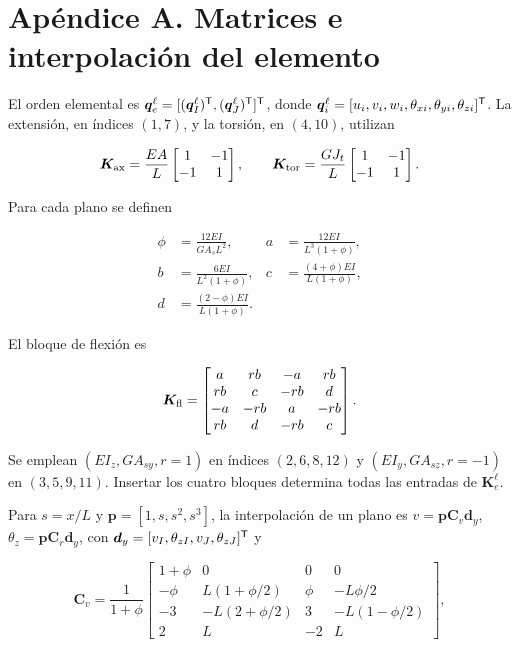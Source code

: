\section{Apéndice A. Matrices e interpolación del elemento}
El orden elemental es $\bm q_e^\ell=[(\bm q_I^\ell)^\mathsf T,(\bm q_J^\ell)^\mathsf T]^\mathsf T$, donde $\bm q_i^\ell=[u_i,v_i,w_i,\theta_{xi},\theta_{yi},\theta_{zi}]^\mathsf T$. La extensión, en índices $(1,7)$, y la torsión, en $(4,10)$, utilizan

\begin{equation}
\bm K_{\rm ax}=\frac{EA}{L}\begin{bmatrix}1&-1\\-1&1\end{bmatrix},\qquad
\bm K_{\rm tor}=\frac{GJ_t}{L}\begin{bmatrix}1&-1\\-1&1\end{bmatrix}.
\end{equation}

Para cada plano se definen

\begin{align}
\phi&=\frac{12EI}{GA_sL^2},&a&=\frac{12EI}{L^3(1+\phi)},\nonumber\\
b&=\frac{6EI}{L^2(1+\phi)},&c&=\frac{(4+\phi)EI}{L(1+\phi)},\nonumber\\
d&=\frac{(2-\phi)EI}{L(1+\phi)}.
\end{align}

El bloque de flexión es

\begin{equation}
\bm K_{\rm fl}=\begin{bmatrix}
a&rb&-a&rb\\rb&c&-rb&d\\-a&-rb&a&-rb\\rb&d&-rb&c
\end{bmatrix}.
\end{equation}

Se emplean $(EI_z,GA_{sy},r=1)$ en índices $(2,6,8,12)$ y $(EI_y,GA_{sz},r=-1)$ en $(3,5,9,11)$. Insertar los cuatro bloques determina todas las entradas de $\bm K_e^\ell$.

Para $s=x/L$ y $\bm p=[1,s,s^2,s^3]$, la interpolación de un plano es $v=\bm p\bm C_v\bm d_y$, $\theta_z=\bm p\bm C_r\bm d_y$, con $\bm d_y=[v_I,\theta_{zI},v_J,\theta_{zJ}]^\mathsf T$ y

\begin{equation}
\bm C_v=\frac1{1+\phi}\begin{bmatrix}
1+\phi&0&0&0\\
-\phi&L(1+\phi/2)&\phi&-L\phi/2\\
-3&-L(2+\phi/2)&3&-L(1-\phi/2)\\
2&L&-2&L
\end{bmatrix},
\end{equation}

